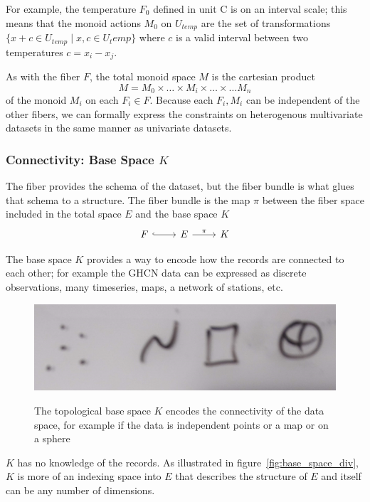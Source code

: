 \documentclass[../main.tex]{subfiles}
\begin{document}
For example, the temperature $F_0$ defined in unit \textdegree C is on an interval scale; this means that the monoid actions $M_0$ on $U_{temp}$ are the set of transformations $\{x + c \in U_{temp} \mid x,c \in U_temp\}$ where $c$ is a valid interval between two temperatures $c=x_i-x_j$.

As with the fiber $F$, the total monoid space $M$ is the cartesian product
\begin{equation}
M = M_{0} \times \ldots \times M_{i}\times \ldots \times\ldots M_{n}
\end{equation}
of the monoid $M_{i}$ on each $F_{i}\in F$. Because each $F_i, M_i$ can be independent of the other fibers, we can formally express the constraints on heterogenous multivariate datasets in the same manner as univariate datasets. 

\subsubsection{Connectivity: Base Space $K$} 
\label{sec:data_base}
The fiber provides the schema of the dataset, but the fiber bundle is what glues that schema to a structure. The fiber bundle is the map $\pi$ between the fiber space included in the total space $E$ and the base space $K$
\begin{equation}
    \label{eq:fiber_bundle}
    \begin{tikzcd}
        F \arrow[r, hook] & E \arrow[r, "\pi"] & K
    \end{tikzcd}
\end{equation}

The base space $K$ provides a way to encode how the records are connected to each other; for example the GHCN data can be expressed as discrete observations, many timeseries, maps, a network of stations, etc.

\begin{figure}[ht!]
    \includegraphics[width=.5\textwidth]{figures/math/k_different_types.png}
    \label{fig:base_space_types}
    \caption{The topological base space $K$ encodes the connectivity of the data space, for example if the data is independent points or a map or on a sphere}
\end{figure}

$K$ has no knowledge of the records. As illustrated in figure~\ref{fig:base_space_div}, $K$ is more of an indexing space into $E$ that describes the structure of $E$ and itself can be any number of dimensions. 
\end{document}
